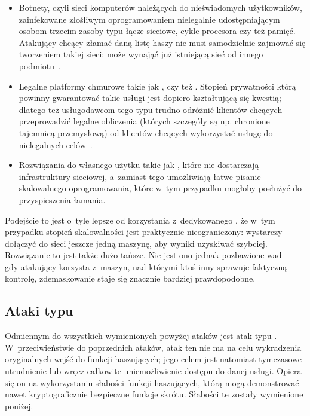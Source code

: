 \begin{itemize}

    \item Botnety, czyli sieci komputerów należących do nieświadomych
    użytkowników, zainfekowane złośliwym oprogramowaniem nielegalnie
    udostępniającym osobom trzecim zasoby typu łącze sieciowe, cykle procesora
    czy też pamięć. Atakujący chcący złamać daną listę haszy nie musi
    samodzielnie zajmować się tworzeniem takiej sieci: może wynająć już
    istniejącą sieć od innego podmiotu~\cite{botnet_rental,botnet_rental2}.

    \item Legalne platformy chmurowe takie jak ,  czy też . Stopień prywatności
    którą powinny gwarantować takie usługi jest dopiero kształtującą się
    kwestią; dlatego też usługodawcom tego typu trudno odróżnić klientów
    chcących przeprowadzić legalne obliczenia (których szczegóły są np.
    chronione tajemnicą przemysłową) od klientów chcących wykorzystać usługę do
    nielegalnych celów~\cite{cloud_criminals}.

    \item Rozwiązania do własnego użytku takie jak , które nie
    dostarczają infrastruktury sieciowej, a~zamiast tego umożliwiają łatwe
    pisanie skalowalnego oprogramowania, które w~tym przypadku mogłoby posłużyć
    do przyspieszenia łamania.

\end{itemize}

Podejście to jest o~tyle lepsze od korzystania z~dedykowanego ,
że w~tym przypadku stopień skalowalności jest praktycznie nieograniczony:
wystarczy dołączyć do sieci jeszcze jedną maszynę, aby wyniki uzyskiwać
szybciej. Rozwiązanie to jest także dużo tańsze. Nie jest ono jednak pozbawione
wad~-- gdy atakujący korzysta z~maszyn, nad którymi ktoś inny sprawuje
faktyczną kontrolę, zdemaskowanie staje się znacznie bardziej prawdopodobne.



\subsection{Ataki typu }
Odmiennym do wszystkich wymienionych powyżej ataków jest atak typu . W~przeciwieństwie do poprzednich ataków, atak ten nie ma na celu
wykradzenia oryginalnych wejść do funkcji haszujących; jego celem jest
natomiast tymczasowe utrudnienie lub wręcz całkowite uniemożliwienie dostępu do
danej usługi. Opiera się on na wykorzystaniu słabości funkcji haszujących,
którą mogą demonstrować nawet kryptograficznie bezpieczne funkcje skrótu.
Słabości te zostały wymienione poniżej.

